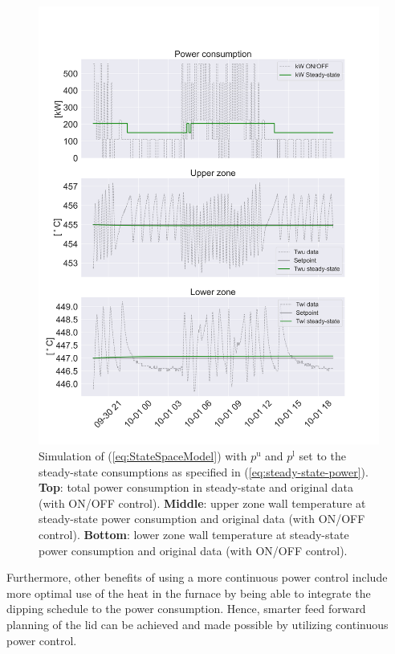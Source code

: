 \documentclass[lettersize,journal]{IEEEtran}
\begin{document}
\begin{figure}[!t]
    \centering
    \includegraphics[width=\columnwidth]{figures/4thOrderModelVisualizationSteadyState.png}
    \caption{Simulation of (\ref{eq:StateSpaceModel}) with $p^{\text{u}}$ and $p^{\text{l}}$ set to the steady-state consumptions as specified in (\ref{eq:steady-state-power}). \textbf{Top}: total power consumption in steady-state and original data (with ON/OFF control). \textbf{Middle}: upper zone wall temperature at steady-state power consumption and original data (with ON/OFF control). \textbf{Bottom}: lower zone wall temperature at steady-state power consumption and original data (with ON/OFF control).}
    \label{fig:4thOrderModelVisualizationSteadyState}
\end{figure}

Furthermore, other benefits of using a more continuous power control include more optimal use of the heat in the furnace by being able to integrate the dipping schedule to the power consumption. Hence, smarter feed forward planning of the lid can be achieved and made possible by utilizing continuous power control.
\end{document}
